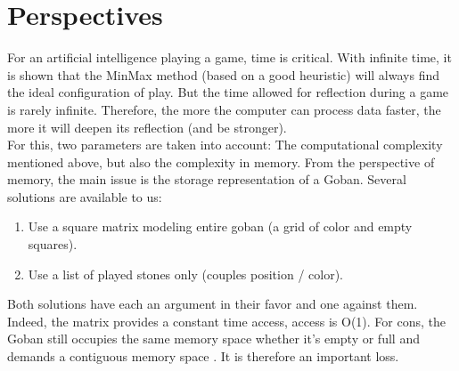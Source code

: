 \documentclass{report}
\begin{document}
\chapter {Perspectives}


For an artificial intelligence playing a game, time is critical. With infinite time, it is shown that the MinMax method (based on a good heuristic) will always find the ideal configuration of play. But the time allowed for reflection during a game is rarely infinite. Therefore, the more the computer can process data faster, the more it will deepen its reflection (and be stronger). \\

For this, two parameters are taken into account: The computational complexity mentioned above, but also the complexity in memory.
From the perspective of memory, the main issue is the storage representation of a Goban. Several solutions are available to us: \\

\begin{enumerate}
\item Use a square matrix modeling entire goban (a grid of color and empty squares).
\item Use a list of played stones only (couples position / color).
\end{enumerate}
Both solutions have each an argument in their favor and one against them. 
Indeed, the matrix provides a constant time access, access is O(1). For cons, the Goban still occupies the same memory space whether it's empty or full and demands a contiguous memory space . It is therefore an important loss. \\
\end{document}
